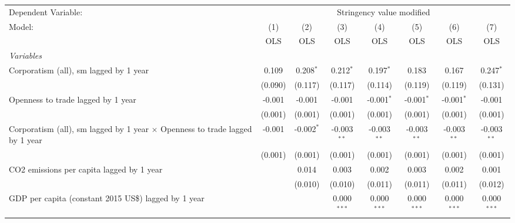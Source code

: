 
\begingroup
\centering
\begin{tabular}{lccccccc}
   \toprule
   Dependent Variable: & \multicolumn{7}{c}{Stringency value modified}\\
   Model:                                                                              & (1)     & (2)          & (3)           & (4)           & (5)           & (6)           & (7)\\  
                                                                                       &  OLS    & OLS          & OLS           & OLS           & OLS           & OLS           & OLS\\  
   \midrule
   \emph{Variables}\\
   Corporatism (all), sm lagged by 1 year                                              & 0.109   & 0.208$^{*}$  & 0.212$^{*}$   & 0.197$^{*}$   & 0.183         & 0.167         & 0.247$^{*}$\\   
                                                                                       & (0.090) & (0.117)      & (0.117)       & (0.114)       & (0.119)       & (0.119)       & (0.131)\\   
   Openness to trade lagged by 1 year                                                  & -0.001  & -0.001       & -0.001        & -0.001$^{*}$  & -0.001$^{*}$  & -0.001$^{*}$  & -0.001\\   
                                                                                       & (0.001) & (0.001)      & (0.001)       & (0.001)       & (0.001)       & (0.001)       & (0.001)\\   
   Corporatism (all), sm lagged by 1 year $\times$ Openness to trade lagged by 1 year  & -0.001  & -0.002$^{*}$ & -0.003$^{**}$ & -0.003$^{**}$ & -0.003$^{**}$ & -0.003$^{**}$ & -0.003$^{**}$\\   
                                                                                       & (0.001) & (0.001)      & (0.001)       & (0.001)       & (0.001)       & (0.001)       & (0.001)\\   
   CO2 emissions per capita lagged by 1 year                                           &         & 0.014        & 0.003         & 0.002         & 0.003         & 0.002         & 0.001\\   
                                                                                       &         & (0.010)      & (0.010)       & (0.011)       & (0.011)       & (0.011)       & (0.012)\\   
   GDP per capita (constant 2015 US\$) lagged by 1 year                                &         &              & 0.000$^{***}$ & 0.000$^{***}$ & 0.000$^{***}$ & 0.000$^{***}$ & 0.000$^{***}$\\   

\end{tabular}
